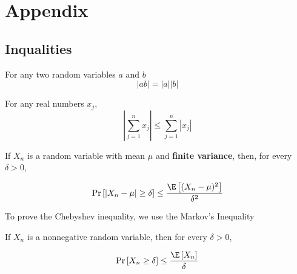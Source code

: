 \documentclass[english,12pt]{book}\usepackage[]{graphicx}\usepackage[]{xcolor}
\begin{document}
\section*{Appendix}
\begin{subappendices}

 \section{Inqualities}\label{appendix-inequalities}

\begin{definition}\label{def:abs-multiplicativity}
For any two random variables $a$ and $b$
\begin{equation}
\left|ab\right| = \left|a\right|\left|b\right|
\end{equation}
\end{definition}

\begin{definition}\label{def:triangle-inequality}
For any real numbers $x_j$, 
\begin{equation}
  \left|\sum_{j= 1}^n x_j\right| \leq \sum_{j = 1}^n \left|x_j\right|
\end{equation}
\end{definition}

\begin{definition}\label{definition:chebyshev_ineq}
	 If $X_n$ is a random variable with mean $\mu$ and \textbf{finite variance}, then, for every $\delta > 0$,
	 
	 \begin{equation*}
	 \Pr\left[\left| X_n - \mu\right|\geq \delta \right]\leq \frac{\E\left[(X_n - \mu)^2\right]}{\delta ^2}
	 \end{equation*}
\end{definition}

To prove the Chebyshev inequality, we use the Markov's Inequality

\begin{definition}\label{definition:chebyshev_ineq}
	 If $X_n$ is a nonnegative random variable, then for every $\delta > 0$,
	 
	 \begin{equation*}
	 \Pr\left[X_n \geq \delta \right]\leq \frac{\E\left[X_n\right]}{\delta}
	 \end{equation*}
\end{definition}


\end{subappendices}
\end{document}
